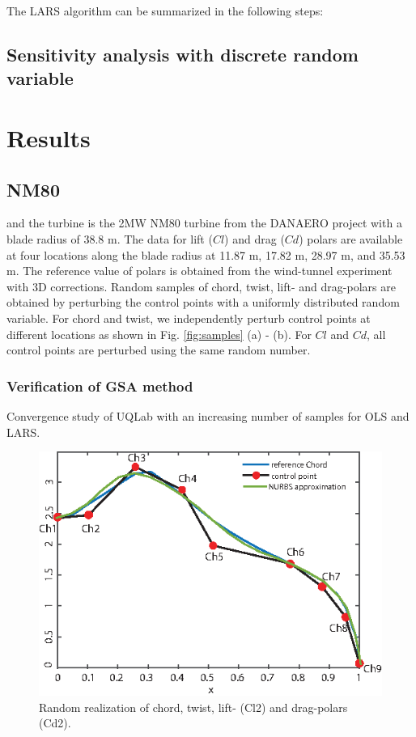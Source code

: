 \documentclass[review]{elsarticle}
\numberwithin{equation}{section}
\numberwithin{equation}{section}
\begin{document}
The LARS algorithm can be summarized in the following steps:


\subsection{Sensitivity analysis with discrete random variable}

\section{Results}\label{sec:results}

\subsection{NM80}
 and the turbine is the 2MW NM80 turbine from the DANAERO project \cite{Troldborg2013} with a blade radius of 38.8 m. The data for lift ($Cl$) and drag ($Cd$) polars are available at four locations along the blade radius at 11.87 m, 17.82 m, 28.97 m, and 35.53 m. The reference value of polars is obtained from the wind-tunnel experiment with 3D corrections. Random samples of chord, twist, lift- and drag-polars are obtained by perturbing the control points with a uniformly distributed random variable. For chord and twist, we independently perturb control points at different locations as shown in Fig. \ref{fig:samples} (a) - (b). For $Cl$ and $Cd$, all control points are perturbed using the same random number.
 
\subsubsection{Verification of GSA method}
Convergence study of UQLab with an increasing number of samples for OLS and LARS.
\begin{figure}[h!]
\centering
\includegraphics[trim={0cm 0cm 0 0cm},clip, scale=1.3]{nurbs_approx.eps}
\caption{Random realization of chord, twist, lift- (Cl2) and drag-polars (Cd2).}
\label{perturbed_samples}
\end{figure}
\end{document}

